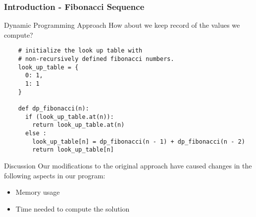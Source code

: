\begin{frame}[fragile]
  \frametitle{Introduction - Fibonacci Sequence}
  \begin{block}{Dynamic Programming Approach}
    How about we keep record of the values we compute?
  \end{block}
  \begin{lstlisting}
    # initialize the look up table with 
    # non-recursively defined fibonacci numbers.
    look_up_table = {
      0: 1,
      1: 1  
    }

    def dp_fibonacci(n):
      if (look_up_table.at(n)):
        return look_up_table.at(n)
      else :
        look_up_table[n] = dp_fibonacci(n - 1) + dp_fibonacci(n - 2)
        return look_up_table[n]
  \end{lstlisting}
\end{frame}


\begin{frame}
  \begin{block}{Discussion}
    Our modifications to the original approach have
    caused changes in the following aspects in our program:
    \begin{itemize}
      \item Memory usage
      \item Time needed to compute the solution
    \end{itemize}
  \end{block}
\end{frame}